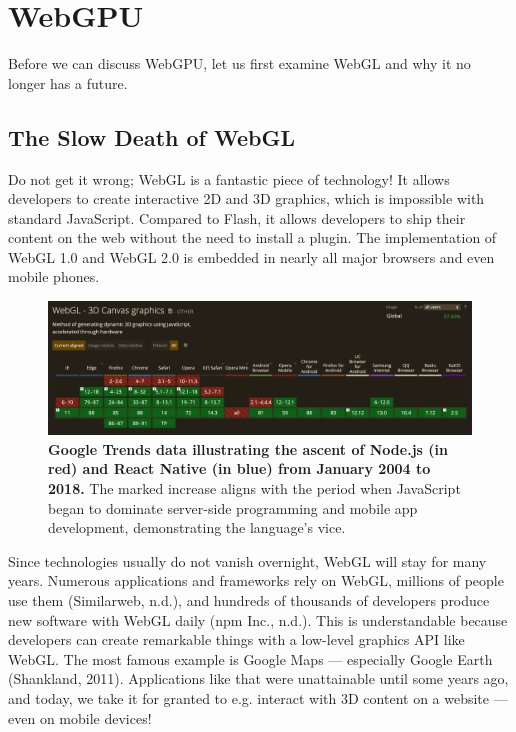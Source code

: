 \documentclass[10pt]{article}
\begin{document}
\begin{sloppypar}
  \section{WebGPU}
  \label{sec:webgpu}

  Before we can discuss WebGPU, let us first examine WebGL and why it no longer has a future.

  \subsection{The Slow Death of WebGL}
  \label{subsec:the-slow-death-of-webgl}

  Do not get it wrong; WebGL is a fantastic piece of technology! It allows developers to create interactive 2D and 3D graphics, which is impossible with standard JavaScript. Compared to Flash, it allows developers to ship their content on the web without the need to install a plugin. The implementation of WebGL 1.0 and WebGL 2.0 is embedded in nearly all major browsers and even mobile phones.

  \begin{figure}[ht]
    \centering
    \includegraphics[width=\textwidth]{figures/can-i-use.png}
    \caption[Google Trends data illustrating the ascent of Node.js and React Native.]{\textbf{Google Trends data illustrating the ascent of Node.js (in red) and React Native (in blue) from January 2004 to 2018.} The marked increase aligns with the period when JavaScript began to dominate server-side programming and mobile app development, demonstrating the language’s vice.}
    \label{fig:can-i-use}
  \end{figure}

  Since technologies usually do not vanish overnight, WebGL will stay for many years. Numerous applications and frameworks rely on WebGL, millions of people use them (Similarweb, n.d.), and hundreds of thousands of developers produce new software with WebGL daily (npm Inc., n.d.). This is understandable because developers can create remarkable things with a low-level graphics API like WebGL. The most famous example is Google Maps — especially Google Earth (Shankland, 2011). Applications like that were unattainable until some years ago, and today, we take it for granted to e.g. interact with 3D content on a website — even on mobile devices!


\end{sloppypar}
\end{document}

